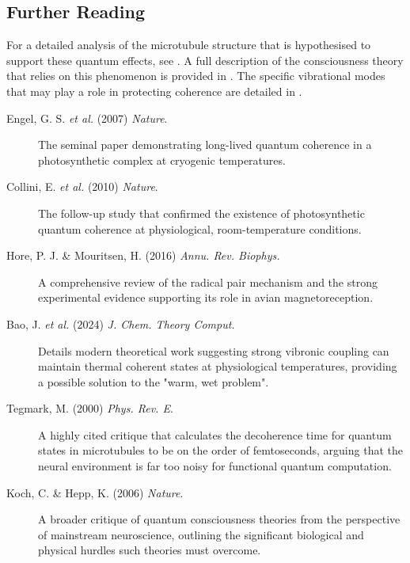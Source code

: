 \begin{importantbox}
\section*{Further Reading}
For a detailed analysis of the microtubule structure that is hypothesised to support these quantum effects, see . A full description of the consciousness theory that relies on this phenomenon is provided in . The specific vibrational modes that may play a role in protecting coherence are detailed in .
\begin{description}
\item[Engel, G. S. \textit{et al.} (2007) \textit{Nature}.] The seminal paper demonstrating long-lived quantum coherence in a photosynthetic complex at cryogenic temperatures.
\item[Collini, E. \textit{et al.} (2010) \textit{Nature}.] The follow-up study that confirmed the existence of photosynthetic quantum coherence at physiological, room-temperature conditions.
\item[Hore, P. J. & Mouritsen, H. (2016) \textit{Annu. Rev. Biophys.}] A comprehensive review of the radical pair mechanism and the strong experimental evidence supporting its role in avian magnetoreception.
\item[Bao, J. \textit{et al.} (2024) \textit{J. Chem. Theory Comput.}] Details modern theoretical work suggesting strong vibronic coupling can maintain thermal coherent states at physiological temperatures, providing a possible solution to the "warm, wet problem".
\end{description}
\begin{description}
\item[Tegmark, M. (2000) \textit{Phys. Rev. E}.] A highly cited critique that calculates the decoherence time for quantum states in microtubules to be on the order of femtoseconds, arguing that the neural environment is far too noisy for functional quantum computation.
\item[Koch, C. & Hepp, K. (2006) \textit{Nature}.] A broader critique of quantum consciousness theories from the perspective of mainstream neuroscience, outlining the significant biological and physical hurdles such theories must overcome.
\end{description}
\end{importantbox}
